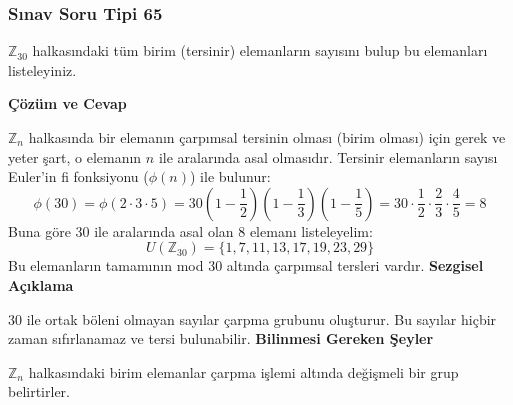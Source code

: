 \documentclass[11pt, a4paper]{article}
\newenvironment{cozum}{
    \vspace{0.5cm}
    \noindent\textcolor{green!60!black}{\faCheckCircle\enspace \textbf{\Large Çözüm ve Cevap}}\par\vspace{0.2cm}
}{}
\newenvironment{sezgisel}{
    \vspace{0.5cm}
    \noindent\textcolor{orange!80!black}{\faLightbulb\enspace \textbf{\Large Sezgisel Açıklama}}\par\vspace{0.2cm}
    \itshape
}{}
\newenvironment{bilgi}{
    \vspace{0.5cm}
    \noindent\textcolor{red!70!black}{\faExclamationTriangle\enspace \textbf{\Large Bilinmesi Gereken Şeyler}}\par\vspace{0.2cm}
}{}
\begin{document}
\subsubsection{Sınav Soru Tipi 65}
\begin{sinavbox}
$\mathbb{Z}_{30}$ halkasındaki tüm birim (tersinir) elemanların sayısını bulup bu elemanları listeleyiniz.
\end{sinavbox}
\begin{cozum}
$\mathbb{Z}_n$ halkasında bir elemanın çarpımsal tersinin olması (birim olması) için gerek ve yeter şart, o elemanın $n$ ile aralarında asal olmasıdır.
Tersinir elemanların sayısı Euler'in fi fonksiyonu ($\phi(n)$) ile bulunur:
\[ \phi(30) = \phi(2 \cdot 3 \cdot 5) = 30 \left(1 - \frac{1}{2}\right)\left(1 - \frac{1}{3}\right)\left(1 - \frac{1}{5}\right) = 30 \cdot \frac{1}{2} \cdot \frac{2}{3} \cdot \frac{4}{5} = 8 \]
Buna göre 30 ile aralarında asal olan 8 elemanı listeleyelim:
\[ U(\mathbb{Z}_{30}) = \{1, 7, 11, 13, 17, 19, 23, 29\} \]
Bu elemanların tamamının mod 30 altında çarpımsal tersleri vardır.
\end{cozum}
\begin{sezgisel}
30 ile ortak böleni olmayan sayılar çarpma grubunu oluşturur. Bu sayılar hiçbir zaman sıfırlanamaz ve tersi bulunabilir.
\end{sezgisel}
\begin{bilgi}
$\mathbb{Z}_n$ halkasındaki birim elemanlar çarpma işlemi altında değişmeli bir grup belirtirler.
\end{bilgi}

\newpage
\end{document}

